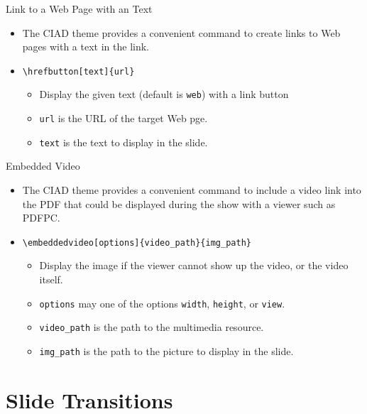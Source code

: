 \documentclass[english,sectioncirclenumberstyle]{ciadbeamer}
\begin{document}
\begin{frame}{Link to a Web Page with an Text}
	\begin{itemize}
	\item The CIAD theme provides a convenient command to create links to Web pages with a text in the link.
	\item \texttt{{\textbackslash}hrefbutton[text]\{url\}}
		\begin{itemize}
		\item Display the given text (default is \texttt{web}) with a link button
		\item \texttt{url} is the URL of the target Web pge.
		\item \texttt{text} is the text to display in the slide.
		\end{itemize}
	\end{itemize}
	\begin{center}
	\end{center}
\end{frame}

\begin{frame}{Embedded Video}
	\begin{itemize}
	\item The CIAD theme provides a convenient command to include a video link into the PDF that could be displayed during the show with a viewer such as PDFPC.
	\item \texttt{{\textbackslash}embeddedvideo[options]\{video\_path\}\{img\_path\}}
		\begin{itemize}
		\item Display the image if the viewer cannot show up the video, or the video itself.
		\item \texttt{options} may one of the options \texttt{width}, \texttt{height}, or \texttt{view}.
		\item \texttt{video\_path} is the path to the multimedia resource.
		\item \texttt{img\_path} is the path to the picture to display in the slide.
		\end{itemize}
	\end{itemize}
\end{frame}

\section{Slide Transitions}
\sectiontableofcontentslide
\end{document}
